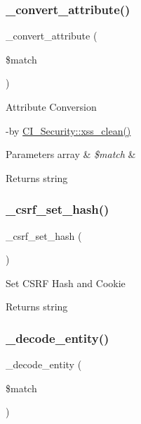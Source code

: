 \subsubsection{\texorpdfstring{\+\_\+convert\+\_\+attribute()}{\_convert\_attribute()}}
{\footnotesize\ttfamily \+\_\+convert\+\_\+attribute (\begin{DoxyParamCaption}\item[{}]{\$match }\end{DoxyParamCaption})\hspace{0.3cm}{\ttfamily [protected]}}

Attribute Conversion

-\/by \mbox{\hyperlink{class_c_i___security_acb759426dbab128d3d8164805225381c}{C\+I\+\_\+\+Security\+::xss\+\_\+clean()}} 
\begin{DoxyParams}[1]{Parameters}
array & {\em \$match} & \\
\hline
\end{DoxyParams}
\begin{DoxyReturn}{Returns}
string 
\end{DoxyReturn}
\mbox{\label{class_c_i___security_a7064dd5501c1dfab05ba6ac8838beb01}} 
\subsubsection{\texorpdfstring{\+\_\+csrf\+\_\+set\+\_\+hash()}{\_csrf\_set\_hash()}}
{\footnotesize\ttfamily \+\_\+csrf\+\_\+set\+\_\+hash (\begin{DoxyParamCaption}{ }\end{DoxyParamCaption})\hspace{0.3cm}{\ttfamily [protected]}}

Set C\+S\+RF Hash and Cookie

\begin{DoxyReturn}{Returns}
string 
\end{DoxyReturn}
\mbox{\label{class_c_i___security_a5289832cb3ae9cee3c12e82ede958874}} 
\subsubsection{\texorpdfstring{\+\_\+decode\+\_\+entity()}{\_decode\_entity()}}
{\footnotesize\ttfamily \+\_\+decode\+\_\+entity (\begin{DoxyParamCaption}\item[{}]{\$match }\end{DoxyParamCaption})\hspace{0.3cm}{\ttfamily [protected]}}

